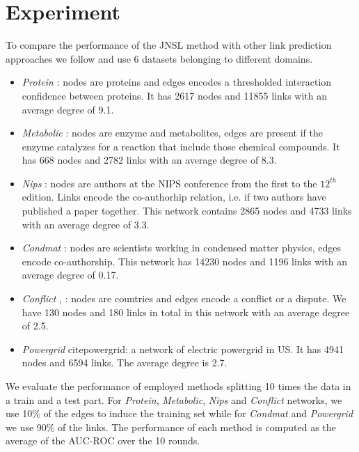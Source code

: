 \documentclass[runningheads,a4paper]{llncs}
\begin{document}
\section{Experiment}
To compare the performance of the JNSL method with other link prediction approaches we follow \cite{matrix-factorization} and use 6 datasets belonging to different domains.
\begin{itemize}
\item \textit{Protein }\cite{protein-protein}: nodes are proteins and edges encodes a thresholded interaction confidence between proteins. It has 2617 nodes and 11855 links with an average degree of 9.1.

\item \textit{Metabolic} \cite{metabolic}: nodes are enzyme and metabolites, edges are present if the enzyme catalyzes for a reaction that include those chemical compounds. It has 668 nodes and 2782 links with an average degree of 8.3.

\item \textit{Nips} \cite{nips}: nodes are authors at the NIPS conference from the first to the $12^{th}$ edition. Links encode the co-authorhip relation, i.e. if two authors have published a paper together. This network contains 2865 nodes and 4733 links with an average degree of 3.3.

\item \textit{Condmat} \cite{condmat}: nodes are scientists working in condensed matter physics, edges encode co-authorship. This network has 14230 nodes and 1196 links with an average degree of 0.17.

\item \textit{Conflict} \cite{conflict1}, \cite{conflict2}: nodes are countries and edges encode a conflict or a dispute. We have 130 nodes and 180 links in total in this network with an average degree of 2.5.

\item \textit{Powergrid} cite{powergrid}: a network of electric powergrid in US. It has 4941 nodes and 6594 links. The average degree is 2.7.
\end{itemize}

We evaluate the performance of employed methods splitting 10 times the data in a train and a test part. For \textit{Protein}, \textit{Metabolic}, \textit{Nips} and \textit{Conflict} networks, we use 10$\%$ of the edges to induce the training set while for \textit{Condmat} and \textit{Powergrid} we use 90$\%$ of the links. The performance of each method is computed as the average of the AUC-ROC over the 10 rounds.
\end{document}
